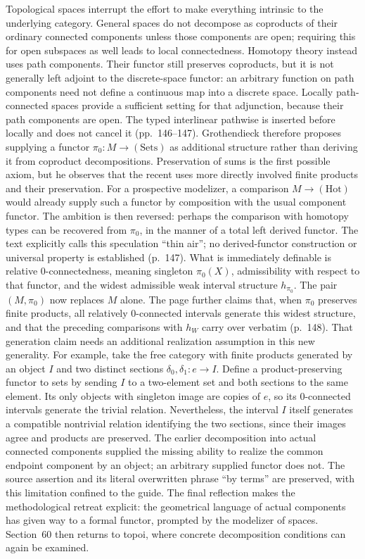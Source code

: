 Topological spaces interrupt the effort to make everything intrinsic to the underlying category. General spaces do not decompose as coproducts of their ordinary connected components unless those components are open; requiring this for open subspaces as well leads to local connectedness. Homotopy theory instead uses path components. Their functor still preserves coproducts, but it is not generally left adjoint to the discrete-space functor: an arbitrary function on path components need not define a continuous map into a discrete space. Locally path-connected spaces provide a sufficient setting for that adjunction, because their path components are open. The typed interlinear pathwise is inserted before locally and does not cancel it (pp.~146--147). Grothendieck therefore proposes supplying a functor $\pi_0:M\to(\mathrm{Sets})$ as additional structure rather than deriving it from coproduct decompositions. Preservation of sums is the first possible axiom, but he observes that the recent uses more directly involved finite products and their preservation. For a prospective modelizer, a comparison $M\to(\mathrm{Hot})$ would already supply such a functor by composition with the usual component functor. The ambition is then reversed: perhaps the comparison with homotopy types can be recovered from $\pi_0$, in the manner of a total left derived functor. The text explicitly calls this speculation ``thin air''; no derived-functor construction or universal property is established (p.~147). What is immediately definable is relative $0$-connectedness, meaning singleton $\pi_0(X)$, admissibility with respect to that functor, and the widest admissible weak interval structure $h_{\pi_0}$. The pair $(M,\pi_0)$ now replaces $M$ alone. The page further claims that, when $\pi_0$ preserves finite products, all relatively $0$-connected intervals generate this widest structure, and that the preceding comparisons with $h_W$ carry over verbatim (p.~148). That generation claim needs an additional realization assumption in this new generality. For example, take the free category with finite products generated by an object $I$ and two distinct sections $\delta_0,\delta_1:e\to I$. Define a product-preserving functor to sets by sending $I$ to a two-element set and both sections to the same element. Its only objects with singleton image are copies of $e$, so its $0$-connected intervals generate the trivial relation. Nevertheless, the interval $I$ itself generates a compatible nontrivial relation identifying the two sections, since their images agree and products are preserved. The earlier decomposition into actual connected components supplied the missing ability to realize the common endpoint component by an object; an arbitrary supplied functor does not. The source assertion and its literal overwritten phrase ``by terms'' are preserved, with this limitation confined to the guide. The final reflection makes the methodological retreat explicit: the geometrical language of actual components has given way to a formal functor, prompted by the modelizer of spaces. Section~60 then returns to topoi, where concrete decomposition conditions can again be examined.
